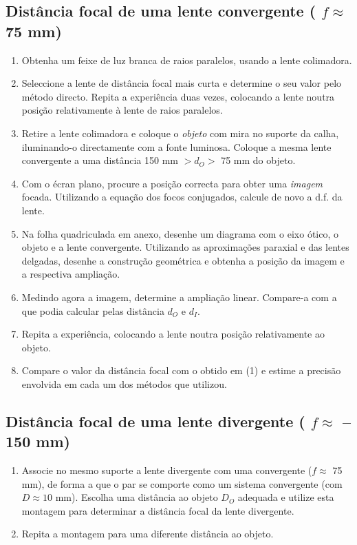 \documentclass[12pt,a4paper,oneside]{paper}
\begin{document}
\subsection{\sf Distância focal de uma lente convergente ( $f  \approx$ 75 mm) }
 
\begin{enumerate}
\item Obtenha  um  feixe  de  luz  branca  de  raios  paralelos, usando a lente colimadora.
\item Seleccione a lente de distância focal mais curta e determine o seu valor pelo método directo. Repita a experiência
duas  vezes,  colocando  a  lente 
noutra posição relativamente à lente de raios paralelos. 
\item Retire a lente colimadora e coloque o \emph{objeto} com mira no suporte da calha, iluminando-o directamente com a fonte luminosa. Coloque a mesma lente convergente a uma distância 150 mm $> d_O >$ 75 mm do objeto.

\item Com o écran plano, procure a posição correcta para obter uma \emph{imagem} focada.
Utilizando a equação dos focos conjugados, calcule de novo a d.f. da lente. 
\item Na folha quadriculada em anexo, desenhe um diagrama com o eixo ótico, o objeto e a lente convergente. Utilizando as aproximações paraxial e das lentes delgadas, desenhe a construção geométrica e obtenha a posição da imagem e a respectiva ampliação.

\item Medindo agora a imagem, determine a ampliação linear. Compare-a com a que podia  calcular pelas distância $d_O$  e $d_I$. 
\item Repita a experiência, colocando a lente noutra posição relativamente ao objeto.  
\item Compare o valor da distância focal com o obtido em (1) e estime a precisão envolvida em 
cada um dos métodos que utilizou. 
\end{enumerate}

\subsection{\sf   Distância focal de uma lente divergente ( $f  \approx$ --150 mm) }
\begin{enumerate}
\item Associe  no  mesmo  suporte  a  lente  divergente  com  uma  convergente ($f  \approx$ 75 mm), de  forma a  que  o 
par se comporte como um sistema convergente (com $D\approx 10$ mm). Escolha uma distância ao objeto $D_O$ adequada e utilize esta montagem para determinar a distância focal da lente divergente.
\item Repita a montagem para uma diferente distância ao objeto. 
\end{enumerate}
\end{document}
